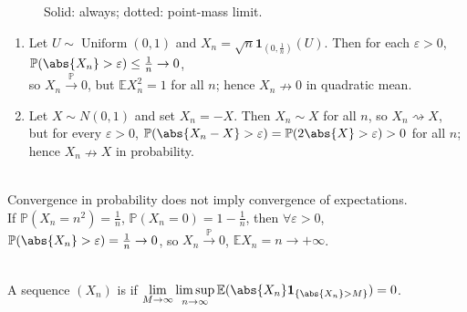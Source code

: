 \begin{figure}[H]
  \centering
  
  \caption{Solid: always; \textcolor{blue!70!black}{dotted}: point-mass limit.}
  \label{fig:probabilistic-convergence-modes}
\end{figure}

\begin{example} \label{ex:convergence-implication-nonconverses} 
\begin{enumerate}[label=(\roman*)]
\setlength{\itemsep}{0pt}
\item Let $U\sim\operatorname{Uniform}(0,1)$ and $X_n=\sqrt{n}\mathbf{1}_{(0,\frac{1}{n})}(U)$. Then for each $\varepsilon>0$, $\mathbb{P}(\abs{X_n}>\varepsilon)\leq\frac{1}{n}\to0$,\\
so $X_n\xrightarrow{\mathbb{P}}0$, but $\mathbb{E}X_n^2=1$ for all $n$; hence $X_n\nrightarrow0$ in quadratic mean.
\item Let $X\sim N(0,1)$ and set $X_n=-X$. Then $X_n\sim X$ for all $n$, so $X_n\rightsquigarrow X$,\\
but for every $\varepsilon>0$, $\mathbb{P}(\abs{X_n-X}>\varepsilon)=\mathbb{P}(2\abs{X}>\varepsilon)>0$ for all $n$; hence $X_n\nrightarrow X$ in probability.
\end{enumerate}
\end{example}

\begin{remark} \label{rem:convergence-in-probability-does-not-control-expectations} \\
Convergence in probability does not imply convergence of expectations.\\
If $\mathbb{P}(X_n=n^2)=\frac{1}{n}$, $\mathbb{P}(X_n=0)=1-\frac{1}{n}$, then $\forall \varepsilon>0$, $\mathbb{P}(\abs{X_n}>\varepsilon)=\frac{1}{n}\to0$, so $X_n\xrightarrow{\mathbb{P}}0$, $\mathbb{E}X_n=n\to+\infty$.
\end{remark}

\begin{definition} \label{def:asymptotic-uniform-integrability} \\
A sequence $(X_n)$ is  if $\lim\limits_{M\to\infty}\limsup\limits_{n\to\infty}\mathbb{E}(\abs{X_n}\mathbf{1}_{\{\abs{X_n}>M\}})=0$.
\end{definition}

